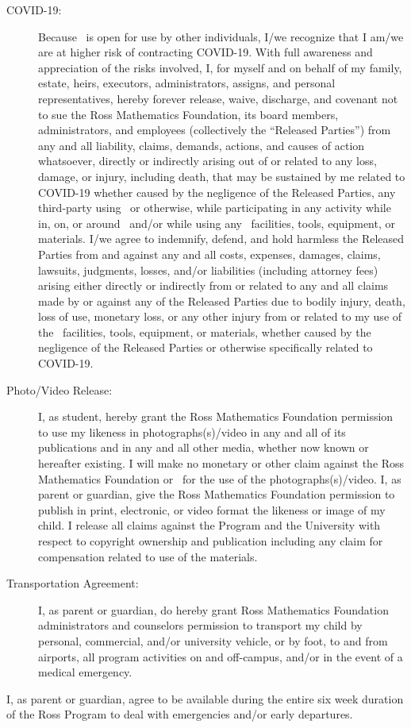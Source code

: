 \documentclass{ross}
\begin{document}
\begin{description}
  \item[COVID-19:] Because \campus\ is open for use
by other individuals, I/we recognize that I am/we are at higher risk of 
contracting COVID-19. With full awareness and appreciation of
the risks involved, I, for myself and on behalf of my family, estate,
heirs, executors, administrators, assigns, and personal representatives, 
hereby forever release, waive, discharge, and covenant not to sue the 
Ross Mathematics Foundation, its board members, administrators, and 
employees (collectively the  ``Released Parties'') from any and all liability, 
claims, demands, actions, and causes of action whatsoever, directly or 
indirectly arising out of or related to any loss, damage, or injury, 
including death, that may be sustained by me related to COVID-19 whether
caused by the negligence of the Released Parties, any third-party using 
\campus\, or otherwise, while participating in any activity while in, on, 
or around \campus\ and/or while using any \campus\ facilities, tools, 
equipment, or materials. I/we agree to indemnify, defend, and hold 
harmless the Released Parties from and against any and all costs, expenses,
damages, claims, lawsuits, judgments, losses, and/or liabilities 
(including attorney fees) arising either directly or indirectly from or 
related to any and all claims made by or against any of the Released 
Parties due to bodily injury, death, loss of use, monetary loss, or 
any other injury from or related to my use of the \campus\ facilities,
tools, equipment, or materials, whether caused by the negligence of 
the Released Parties or otherwise specifically related to COVID-19.
\item[Photo/Video Release:] I, as student, hereby grant the Ross
  Mathematics Foundation permission to use my likeness in
  photographs(s)/video in any and all of its publications and in any
  and all other media, whether now known or hereafter existing. I will
  make no monetary or other claim against the Ross Mathematics Foundation or
 \campus\ for the use of the photographs(s)/video. I, as parent or
  guardian, give the Ross Mathematics Foundation permission to publish in
  print, electronic, or video format the likeness or image of my
  child. I release all claims against the Program and the University
  with respect to copyright ownership and publication including any
  claim for compensation related to use of the materials.
\item[Transportation Agreement:] I, as parent or guardian, do hereby
  grant Ross Mathematics Foundation administrators and counselors
  permission to transport my child by personal, commercial, and/or
  university vehicle, or by foot, to and from airports, all program
  activities on and off-campus, and/or in the event of a medical
  emergency.
\end{description}
I, as parent or guardian, agree to be available during the entire six
week duration of the Ross Program to deal with emergencies and/or early
departures.
\end{document}
